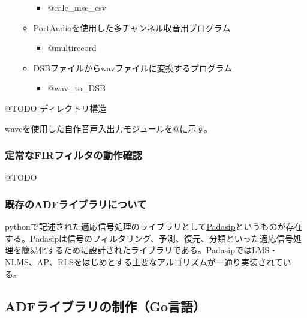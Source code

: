 \begin{itemize}
\begin{itemize}
    \begin{itemize}
    \tightlist
    \item
      @calc\_mse\_csv
    \end{itemize}
  \item
    PortAudioを使用した多チャンネル収音用プログラム

    \begin{itemize}
    \tightlist
    \item
      @multirecord
    \end{itemize}
  \item
    DSBファイルからwavファイルに変換するプログラム

    \begin{itemize}
    \tightlist
    \item
      @wav\_to\_DSB
    \end{itemize}
  \end{itemize}
\end{itemize}

@TODO ディレクトリ構造

waveを使用した自作音声入出力モジュールを@に示す。

\hypertarget{ux5b9aux5e38ux306afirux30d5ux30a3ux30ebux30bfux306eux52d5ux4f5cux78baux8a8d}{%
\subsubsection{定常なFIRフィルタの動作確認}\label{ux5b9aux5e38ux306afirux30d5ux30a3ux30ebux30bfux306eux52d5ux4f5cux78baux8a8d}}

@TODO

\hypertarget{ux65e2ux5b58ux306eadfux30e9ux30a4ux30d6ux30e9ux30eaux306bux3064ux3044ux3066}{%
\subsubsection{既存のADFライブラリについて}\label{ux65e2ux5b58ux306eadfux30e9ux30a4ux30d6ux30e9ux30eaux306bux3064ux3044ux3066}}

pythonで記述された適応信号処理のライブラリとして\href{https://matousc89.github.io/padasip/index.html\#padasip}{Padasip}というものが存在する。Padasipは信号のフィルタリング、予測、復元、分類といった適応信号処理を簡易化するために設計されたライブラリである。PadasipではLMS・NLMS、AP、RLSをはじめとする主要なアルゴリズムが一通り実装されている。

\hypertarget{adfux30e9ux30a4ux30d6ux30e9ux30eaux306eux5236ux4f5cgoux8a00ux8a9e}{%
\subsection{ADFライブラリの制作（Go言語）}\label{adfux30e9ux30a4ux30d6ux30e9ux30eaux306eux5236ux4f5cgoux8a00ux8a9e}}

